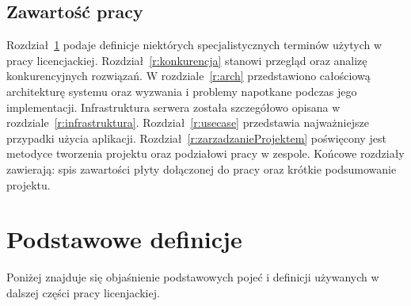 \documentclass[licencjacka]{pracamgr}
\begin{document}
\section*{Zawartość pracy}
Rozdział~\ref{r:definicje} podaje definicje niektórych specjalistycznych terminów użytych w pracy licencjackiej.
Rozdział~\ref{r:konkurencja} stanowi przegląd oraz analizę konkurencyjnych rozwiązań. W rozdziale~\ref{r:arch} przedstawiono całościową architekturę systemu oraz wyzwania i problemy napotkane podczas jego implementacji. Infrastruktura serwera została szczegółowo opisana w rozdziale~\ref{r:infrastruktura}. Rozdział~\ref{r:usecase} przedstawia najważniejsze przypadki użycia aplikacji.  Rozdział~\ref{r:zarzadzanieProjektem} poświęcony jest metodyce tworzenia projektu oraz podziałowi pracy w zespole. Końcowe rozdziały zawierają: spis zawartości płyty dołączonej do pracy oraz krótkie podsumowanie projektu.

\chapter{Podstawowe definicje}\label{r:definicje}

Poniżej znajduje się objaśnienie podstawowych pojeć i definicji używanych w dalszej części pracy licenjackiej.
\end{document}
